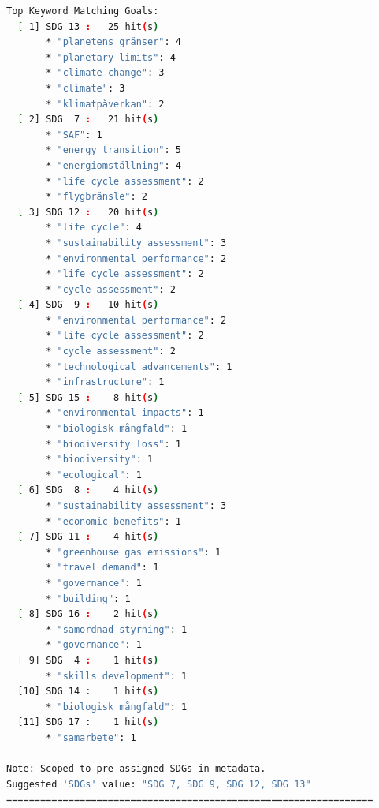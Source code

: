 \begin{casestudySection}
\begin{lstlisting}[language={bash}, basicstyle=\footnotesize, escapechar=|, breaklines=true,
    postbreak=\usebox{\lstbreakbox}, caption={Program's output}, label=lst:t_18531Output]
Top Keyword Matching Goals:
  [ 1] SDG 13 :   25 hit(s)
       * "planetens gränser": 4
       * "planetary limits": 4
       * "climate change": 3
       * "climate": 3
       * "klimatpåverkan": 2
  [ 2] SDG  7 :   21 hit(s)
       * "SAF": 1
       * "energy transition": 5
       * "energiomställning": 4
       * "life cycle assessment": 2
       * "flygbränsle": 2
  [ 3] SDG 12 :   20 hit(s)
       * "life cycle": 4
       * "sustainability assessment": 3
       * "environmental performance": 2
       * "life cycle assessment": 2
       * "cycle assessment": 2
  [ 4] SDG  9 :   10 hit(s)
       * "environmental performance": 2
       * "life cycle assessment": 2
       * "cycle assessment": 2
       * "technological advancements": 1
       * "infrastructure": 1
  [ 5] SDG 15 :    8 hit(s)
       * "environmental impacts": 1
       * "biologisk mångfald": 1
       * "biodiversity loss": 1
       * "biodiversity": 1
       * "ecological": 1
  [ 6] SDG  8 :    4 hit(s)
       * "sustainability assessment": 3
       * "economic benefits": 1
  [ 7] SDG 11 :    4 hit(s)
       * "greenhouse gas emissions": 1
       * "travel demand": 1
       * "governance": 1
       * "building": 1
  [ 8] SDG 16 :    2 hit(s)
       * "samordnad styrning": 1
       * "governance": 1
  [ 9] SDG  4 :    1 hit(s)
       * "skills development": 1
  [10] SDG 14 :    1 hit(s)
       * "biologisk mångfald": 1
  [11] SDG 17 :    1 hit(s)
       * "samarbete": 1
-----------------------------------------------------------------
Note: Scoped to pre-assigned SDGs in metadata.
Suggested 'SDGs' value: "SDG 7, SDG 9, SDG 12, SDG 13"
=================================================================
\end{lstlisting}


\end{casestudySection}
